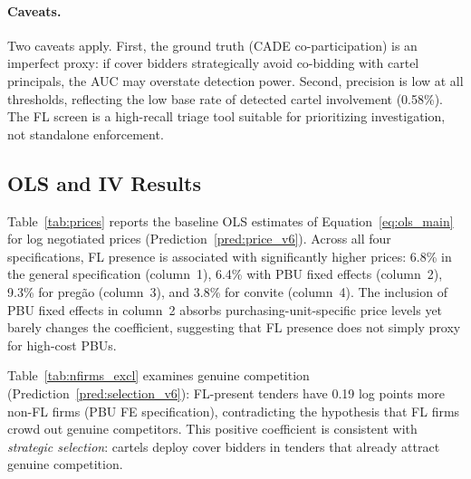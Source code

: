 \paragraph{Caveats.}
Two caveats apply. First, the ground truth (CADE co-participation)
is an imperfect proxy: if cover bidders strategically avoid
co-bidding with cartel principals, the AUC may overstate detection
power. Second, precision is low at all thresholds, reflecting the
low base rate of detected cartel involvement (0.58\%). The FL
screen is a high-recall triage tool suitable for prioritizing
investigation, not standalone enforcement.



\subsection{OLS and IV Results}
\label{sec:results_ols}

Table~\ref{tab:prices} reports the baseline OLS estimates of
Equation~\eqref{eq:ols_main} for log negotiated prices
(Prediction~\ref{pred:price_v6}). Across all four
specifications, FL presence is associated with significantly higher
prices: 6.8\% in the general specification (column~1), 6.4\% with PBU
fixed effects (column~2), 9.3\% for preg\~ao (column~3), and 3.8\% for
convite (column~4). The inclusion of PBU fixed effects in column~2
absorbs purchasing-unit-specific price levels yet barely changes the
coefficient, suggesting that FL presence does not simply proxy for
high-cost PBUs.



Table~\ref{tab:nfirms_excl} examines genuine competition
(Prediction~\ref{pred:selection_v6}): FL-present
tenders have 0.19 log points more non-FL firms (PBU FE specification),
contradicting the hypothesis that FL firms crowd out genuine competitors.
This positive coefficient is consistent with \emph{strategic selection}:
cartels deploy cover bidders in tenders that already attract genuine
competition.



